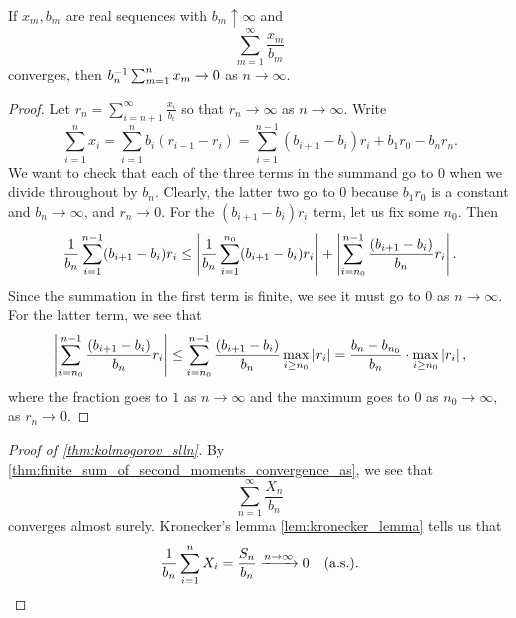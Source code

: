 \begin{lemma} \label{lem:kronecker_lemma}
    If $x_m, b_m$ are real sequences with $b_m \uparrow \infty$ and
    \[ \sum_{m=1}^\infty \frac{x_m}{b_m} \]
    converges, then $b_n^{-1} \sum_{m=1}^n x_m \to 0$ as $n \to \infty$.
\end{lemma}
\begin{proof}
    Let $r_n = \sum_{i=n+1}^\infty \frac{x_i}{b_i}$ so that $r_n \to \infty$ as $n \to \infty$. Write
    \[ \sum_{i=1}^n x_i = \sum_{i=1}^n b_i(r_{i-1} - r_i) = \sum_{i=1}^{n-1} (b_{i+1} - b_i) r_i + b_1 r_0 - b_n r_n. \]
    We want to check that each of the three terms in the summand go to $0$ when we divide throughout by $b_n$. Clearly, the latter two go to $0$ because $b_1 r_0$ is a constant and $b_n \to \infty$, and $r_n \to 0$. For the $(b_{i+1} - b_i) r_i$ term, let us fix some $n_0$. Then
    \[ \frac{1}{b_n} \sum_{i=1}^{n-1} (b_{i+1} - b_i) r_i \leq \left\lvert \frac{1}{b_n} \sum_{i=1}^{n_0} (b_{i+1} - b_i) r_i \right\rvert + \left\lvert \sum_{i=n_0}^{n-1} \frac{(b_{i+1} - b_i)}{b_n} r_i \right\rvert. \]
    Since the summation in the first term is finite, we see it must go to $0$ as $n \to \infty$. For the latter term, we see that
    \[ \left\lvert \sum_{i=n_0}^{n-1} \frac{(b_{i+1} - b_i)}{b_n} r_i \right\rvert \leq \sum_{i=n_0}^{n-1} \frac{(b_{i+1} - b_i)}{b_n} \max_{i \geq n_0} \left\lvert r_i \right\rvert = \frac{b_n - b_{n_0}}{b_n} \cdot \max_{i \geq n_0} \left\lvert r_i \right\rvert, \]
    where the fraction goes to $1$ as $n \to \infty$ and the maximum goes to $0$ as $n_0 \to \infty$, as $r_n \to 0$.
\end{proof}

\newpage
\begin{proof}[Proof of \ref{thm:kolmogorov_slln}]
    By \ref{thm:finite_sum_of_second_moments_convergence_as}, we see that
    \[ \sum_{n=1}^\infty \frac{X_n}{b_n} \]
    converges almost surely. Kronecker's lemma \ref{lem:kronecker_lemma} tells us that
    \[ \frac{1}{b_n} \sum_{i=1}^n X_i = \frac{S_n}{b_n} \xrightarrow{n \to \infty} 0 \quad \text{(a.s.)}. \qedhere \]
\end{proof}

